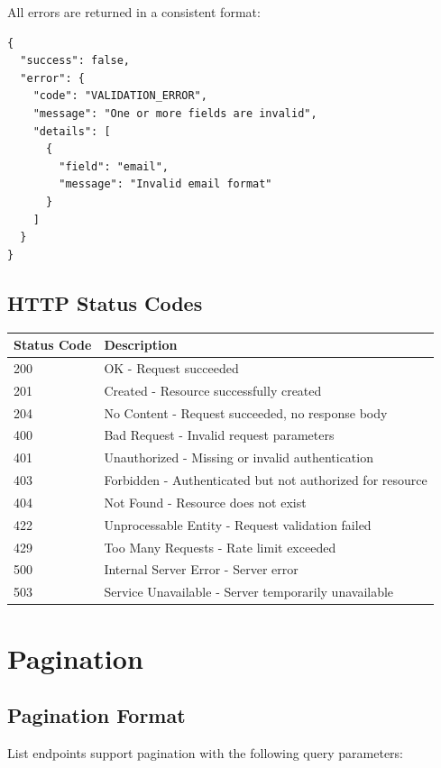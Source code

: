 \documentclass[12pt,a4paper]{report}
\begin{document}
All errors are returned in a consistent format:

\begin{lstlisting}
{
  "success": false,
  "error": {
    "code": "VALIDATION_ERROR",
    "message": "One or more fields are invalid",
    "details": [
      {
        "field": "email",
        "message": "Invalid email format"
      }
    ]
  }
}
\end{lstlisting}

\section{HTTP Status Codes}

\begin{table}[H]
\centering
\begin{tabular}{lp{10cm}}
\toprule
\textbf{Status Code} & \textbf{Description} \\
\midrule
200 & OK - Request succeeded \\
201 & Created - Resource successfully created \\
204 & No Content - Request succeeded, no response body \\
400 & Bad Request - Invalid request parameters \\
401 & Unauthorized - Missing or invalid authentication \\
403 & Forbidden - Authenticated but not authorized for resource \\
404 & Not Found - Resource does not exist \\
422 & Unprocessable Entity - Request validation failed \\
429 & Too Many Requests - Rate limit exceeded \\
500 & Internal Server Error - Server error \\
503 & Service Unavailable - Server temporarily unavailable \\
\bottomrule
\end{tabular}
\end{table}

\chapter{Pagination}

\section{Pagination Format}

List endpoints support pagination with the following query parameters:
\end{document}
